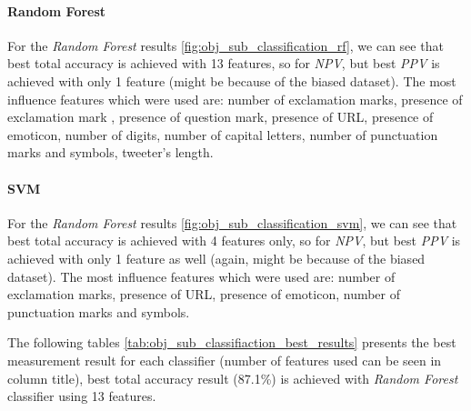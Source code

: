 \documentclass[letterpaper,twocolumn,10pt]{article}
\begin{document}
\paragraph{Random Forest} For the \textit{Random Forest} results \ref{fig:obj_sub_classification_rf}, we can see that best total accuracy is achieved with 13 features, so for \textit{NPV}, but best \textit{PPV} is achieved with only 1 feature (might be because of the biased dataset). The most influence features which were used are:
number of exclamation marks, presence of exclamation mark , presence of question mark, presence of URL, presence of emoticon, number of digits, number of capital letters, number of punctuation marks and symbols, tweeter's length.

\paragraph{SVM} For the \textit{Random Forest} results \ref{fig:obj_sub_classification_svm}, we can see that best total accuracy is achieved with 4 features only, so for \textit{NPV}, but best \textit{PPV} is achieved with only 1 feature as well (again, might be because of the biased dataset). The most influence features which were used are:
number of exclamation marks, presence of URL, presence of emoticon, number of punctuation marks and symbols.

The following tables \ref{tab:obj_sub_classifiaction_best_results} presents the best measurement result for each classifier (number of features used can be seen in column title), best total accuracy result (87.1\%) is achieved with \textit{Random Forest} classifier using 13 features. \\

\begin{table}[H]
	\caption{Objective/Subjective Classification Best Results}
	\label{tab:obj_sub_classifiaction_best_results}
	\begin{center}
	\end{center}
\end{table}
\end{document}
